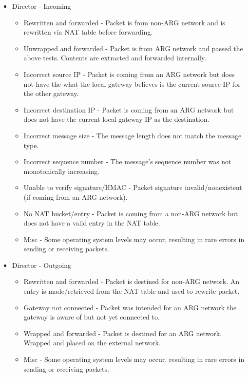 \begin{itemize}
\item Director - Incoming
	\begin{itemize}
	\item Rewritten and forwarded - Packet is from non-\ac{ARG} network and is rewritten via \ac{NAT} table before forwarding.
	\item Unwrapped and forwarded - Packet is from \ac{ARG} network and passed the above tests. Contents are extracted and forwarded internally.

	\item Incorrect source \ac{IP} - Packet is coming from an \ac{ARG} network but does not have the what the local gateway believes is the current source IP for the other gateway.
	\item Incorrect destination \ac{IP} - Packet is coming from an \ac{ARG} network but does not have the current local gateway \ac{IP} as the destination.
	\item Incorrect message size - The message length does not match the message type.
	\item Incorrect sequence number - The message's sequence number was not monotonically increasing. 
	\item Unable to verify signature/\ac{HMAC} - Packet signature invalid/nonexistent (if coming from an \ac{ARG} network).
	\item No \ac{NAT} bucket/entry - Packet is coming from a non-\ac{ARG} network but does not have a valid entry in the \ac{NAT} table.

	\item Misc - Some operating system levels may occur, resulting in rare errors in sending or receiving packets.
	\end{itemize}

\item Director - Outgoing
	\begin{itemize}
	\item Rewritten and forwarded - Packet is destined for non-\ac{ARG} network. An entry is made/retrieved from the \ac{NAT} table and used to rewrite packet.

	\item Gateway not connected - Packet was intended for an ARG network the gateway is aware of but not yet connected to.
	\item Wrapped and forwarded - Packet is destined for an \ac{ARG} network. Wrapped and placed on the external network.

	\item Misc - Some operating system levels may occur, resulting in rare errors in sending or receiving packets.
	\end{itemize}
\end{itemize}


